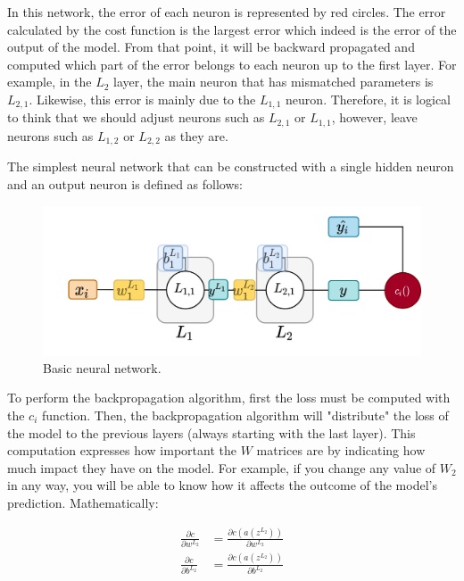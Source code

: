 In this network, the error of each neuron is represented by red circles. The error calculated by the cost function is the largest error which indeed is the error of the output of the model. From that point, it will be backward propagated and computed which part of the error belongs to each neuron up to the first layer. For example, in the $L_2$ layer, the main neuron that has mismatched parameters is $L_{2,1}$. Likewise, this error is mainly due to the $L_{1,1}$ neuron. Therefore, it is logical to think that we should adjust neurons such as $L_{2,1}$ or $L_{1,1}$, however, leave neurons such as $L_{1,2}$ or $L_{2,2}$ as they are.
\newline
 
 The simplest neural network that can be constructed with a single hidden neuron and an output neuron is defined as follows:

\begin{figure}[H]
    \centering
    \includegraphics[width=12cm]{images/state-of-art/back-propagation/basic_network.png}
    \caption{Basic neural network.}
    \label{fig:basic_network}
\end{figure}

To perform the backpropagation algorithm, first the loss must be computed with the $c_i$ function. Then, the backpropagation algorithm will "distribute" the loss of the model to the previous layers (always starting with the last layer). This computation expresses how important the $W$ matrices are by indicating how much impact they have on the model. For example, if you change any value of $W_2$ in any way, you will be able to know how it affects the outcome of the model's prediction. Mathematically:

\begin{equation}
\begin{split}
    \frac{\partial c}{\partial w^{L_2}} &= \frac{\partial c(a(z^{L_2}))}{\partial w^{L_2}} \\
    \frac{\partial c}{\partial b^{L_2}} &= \frac{\partial c(a(z^{L_2}))}{\partial b^{L_2}} 
    \label{eqn:backpropagationsimplenetworklayer2}
\end{split}
\end{equation}

